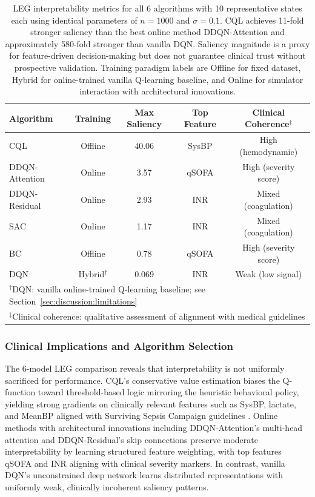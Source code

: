 \begin{table}[htbp]
\centering
\caption{LEG interpretability metrics for all 6 algorithms with 10 representative states each using identical parameters of $n=1000$ and $\sigma=0.1$. CQL achieves 11-fold stronger saliency than the best online method DDQN-Attention and approximately 580-fold stronger than vanilla DQN. Saliency magnitude is a proxy for feature-driven decision-making but does not guarantee clinical trust without prospective validation. Training paradigm labels are Offline for fixed dataset, Hybrid for online-trained vanilla Q-learning baseline, and Online for simulator interaction with architectural innovations.}
\label{tab:interpretability-metrics}
\begin{tabular}{lcccc}
\toprule
\textbf{Algorithm} & \textbf{Training} & \textbf{Max Saliency} & \textbf{Top Feature} & \textbf{Clinical Coherence$^\ddagger$} \\
\midrule
CQL                & Offline  & 40.06  & SysBP    & High (hemodynamic) \\
DDQN-Attention     & Online   & 3.57   & qSOFA    & High (severity score) \\
DDQN-Residual      & Online   & 2.93   & INR      & Mixed (coagulation) \\
SAC                & Online   & 1.17   & INR      & Mixed (coagulation) \\
BC                 & Offline  & 0.78   & qSOFA    & High (severity score) \\
DQN                & Hybrid$^\dagger$  & 0.069  & INR      & Weak (low signal) \\
\bottomrule
\multicolumn{5}{l}{\scriptsize $^\dagger$DQN: vanilla online-trained Q-learning baseline; see Section~\ref{sec:discussion:limitations}} \\
\multicolumn{5}{l}{\scriptsize $^\ddagger$Clinical coherence: qualitative assessment of alignment with medical guidelines} \\
\end{tabular}
\end{table}


\subsubsection{Clinical Implications and Algorithm Selection}

The 6-model LEG comparison reveals that interpretability is not uniformly sacrificed for performance. CQL's conservative value estimation biases the Q-function toward threshold-based logic mirroring the heuristic behavioral policy, yielding strong gradients on clinically relevant features such as SysBP, lactate, and MeanBP aligned with Surviving Sepsis Campaign guidelines \citep{rhodes2017ssc}. Online methods with architectural innovations including DDQN-Attention's multi-head attention and DDQN-Residual's skip connections preserve moderate interpretability by learning structured feature weighting, with top features qSOFA and INR aligning with clinical severity markers. In contrast, vanilla DQN's unconstrained deep network learns distributed representations with uniformly weak, clinically incoherent saliency patterns.


